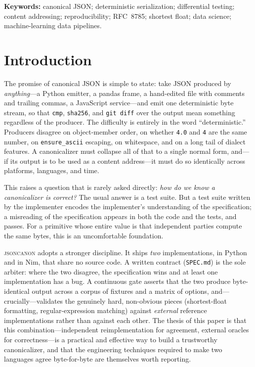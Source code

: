\documentclass[11pt]{article}
\newcommand{\tool}{\textsc{jsoncanon}}
\newcommand{\code}[1]{\texttt{#1}}
\begin{document}
\noindent\textbf{Keywords:} canonical JSON; deterministic serialization;
differential testing; content addressing; reproducibility; RFC~8785; shortest
float; data science; machine-learning data pipelines.

\section{Introduction}

The promise of canonical JSON is simple to state: take JSON produced by
\emph{anything}---a Python emitter, a pandas frame, a hand-edited file with
comments and trailing commas, a JavaScript service---and emit one deterministic
byte stream, so that \code{cmp}, \code{sha256}, and \code{git diff} over the
output mean something regardless of the producer. The difficulty is entirely in
the word ``deterministic.'' Producers disagree on object-member order, on
whether \code{4.0} and \code{4} are the same number, on \code{ensure\_ascii}
escaping, on whitespace, and on a long tail of dialect features. A
canonicalizer must collapse all of that to a single normal form, and---if its
output is to be used as a content address---it must do so identically across
platforms, languages, and time.

This raises a question that is rarely asked directly: \emph{how do we know a
canonicalizer is correct?} The usual answer is a test suite. But a test suite
written by the implementer encodes the implementer's understanding of the
specification; a misreading of the specification appears in both the code and
the tests, and passes. For a primitive whose entire value is that independent
parties compute the same bytes, this is an uncomfortable foundation.

\tool{} adopts a stronger discipline. It ships \emph{two} implementations, in
Python and in Nim, that share no source code. A written contract
(\code{SPEC.md}) is the sole arbiter: where the two disagree, the specification
wins and at least one implementation has a bug. A continuous gate asserts that
the two produce byte-identical output across a corpus of fixtures and a matrix
of options, and---crucially---validates the genuinely hard, non-obvious pieces
(shortest-float formatting, regular-expression matching) against \emph{external}
reference implementations rather than against each other. The thesis of this
paper is that this combination---independent reimplementation for agreement,
external oracles for correctness---is a practical and effective way to build a
trustworthy canonicalizer, and that the engineering techniques required to make
two languages agree byte-for-byte are themselves worth reporting.
\end{document}
